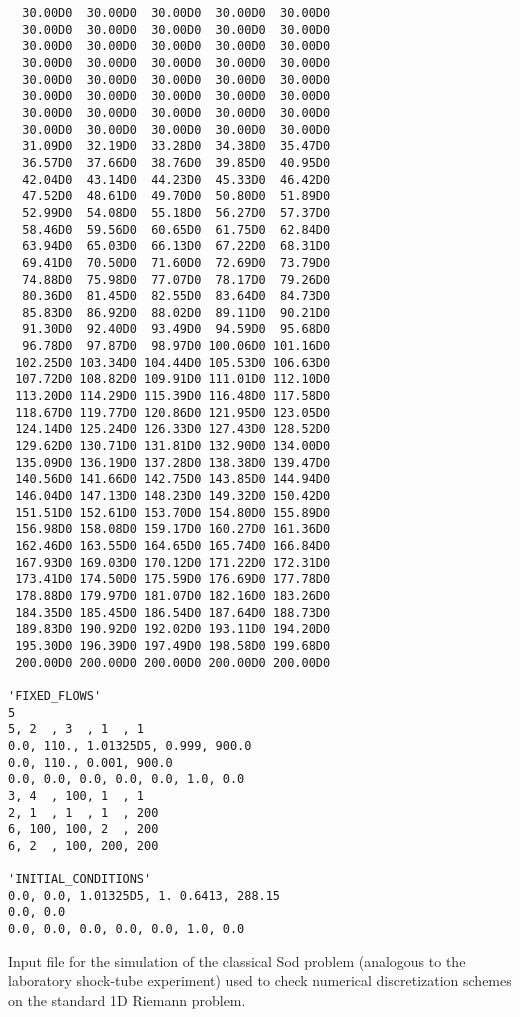 \begin{verbatim}
  30.00D0  30.00D0  30.00D0  30.00D0  30.00D0
  30.00D0  30.00D0  30.00D0  30.00D0  30.00D0
  30.00D0  30.00D0  30.00D0  30.00D0  30.00D0
  30.00D0  30.00D0  30.00D0  30.00D0  30.00D0
  30.00D0  30.00D0  30.00D0  30.00D0  30.00D0
  30.00D0  30.00D0  30.00D0  30.00D0  30.00D0
  30.00D0  30.00D0  30.00D0  30.00D0  30.00D0
  30.00D0  30.00D0  30.00D0  30.00D0  30.00D0
  31.09D0  32.19D0  33.28D0  34.38D0  35.47D0
  36.57D0  37.66D0  38.76D0  39.85D0  40.95D0
  42.04D0  43.14D0  44.23D0  45.33D0  46.42D0
  47.52D0  48.61D0  49.70D0  50.80D0  51.89D0
  52.99D0  54.08D0  55.18D0  56.27D0  57.37D0
  58.46D0  59.56D0  60.65D0  61.75D0  62.84D0
  63.94D0  65.03D0  66.13D0  67.22D0  68.31D0
  69.41D0  70.50D0  71.60D0  72.69D0  73.79D0
  74.88D0  75.98D0  77.07D0  78.17D0  79.26D0
  80.36D0  81.45D0  82.55D0  83.64D0  84.73D0
  85.83D0  86.92D0  88.02D0  89.11D0  90.21D0
  91.30D0  92.40D0  93.49D0  94.59D0  95.68D0
  96.78D0  97.87D0  98.97D0 100.06D0 101.16D0
 102.25D0 103.34D0 104.44D0 105.53D0 106.63D0
 107.72D0 108.82D0 109.91D0 111.01D0 112.10D0
 113.20D0 114.29D0 115.39D0 116.48D0 117.58D0
 118.67D0 119.77D0 120.86D0 121.95D0 123.05D0
 124.14D0 125.24D0 126.33D0 127.43D0 128.52D0
 129.62D0 130.71D0 131.81D0 132.90D0 134.00D0
 135.09D0 136.19D0 137.28D0 138.38D0 139.47D0
 140.56D0 141.66D0 142.75D0 143.85D0 144.94D0
 146.04D0 147.13D0 148.23D0 149.32D0 150.42D0
 151.51D0 152.61D0 153.70D0 154.80D0 155.89D0
 156.98D0 158.08D0 159.17D0 160.27D0 161.36D0
 162.46D0 163.55D0 164.65D0 165.74D0 166.84D0
 167.93D0 169.03D0 170.12D0 171.22D0 172.31D0
 173.41D0 174.50D0 175.59D0 176.69D0 177.78D0
 178.88D0 179.97D0 181.07D0 182.16D0 183.26D0
 184.35D0 185.45D0 186.54D0 187.64D0 188.73D0
 189.83D0 190.92D0 192.02D0 193.11D0 194.20D0
 195.30D0 196.39D0 197.49D0 198.58D0 199.68D0
 200.00D0 200.00D0 200.00D0 200.00D0 200.00D0

'FIXED_FLOWS'
5
5, 2  , 3  , 1  , 1
0.0, 110., 1.01325D5, 0.999, 900.0
0.0, 110., 0.001, 900.0
0.0, 0.0, 0.0, 0.0, 0.0, 1.0, 0.0  
3, 4  , 100, 1  , 1
2, 1  , 1  , 1  , 200
6, 100, 100, 2  , 200
6, 2  , 100, 200, 200

'INITIAL_CONDITIONS'
0.0, 0.0, 1.01325D5, 1. 0.6413, 288.15 
0.0, 0.0
0.0, 0.0, 0.0, 0.0, 0.0, 1.0, 0.0
\end{verbatim}

\newpage
Input file for the simulation of the classical
Sod problem (analogous to the laboratory shock-tube experiment)
used to check numerical discretization schemes on the standard
1D Riemann problem.

